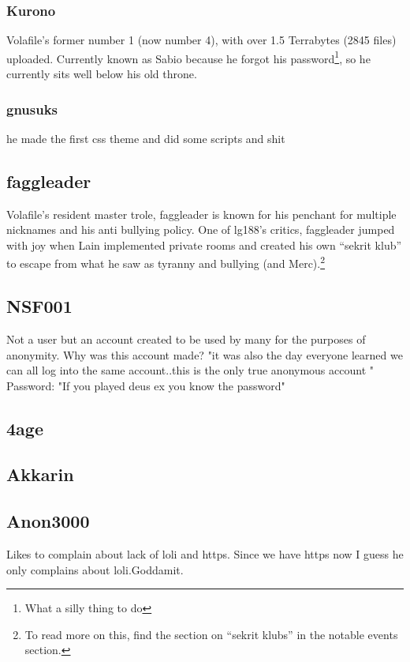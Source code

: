 \documentclass[12pt]{report}
\begin{document}
{\subsubsection{Kurono}
	Volafile's former number 1 (now number 4), with over 1.5 Terrabytes (2845 files) uploaded. Currently known as Sabio because he forgot his password\footnote{What a silly thing to do}, so he currently sits well below his old throne.
	
\subsubsection{gnusuks}
	he made the first css theme and did some scripts and shit 
	
\subsection{faggleader}
	Volafile's resident master trole, faggleader is known for his penchant for multiple nicknames and his anti bullying policy. One of lg188's critics, faggleader jumped with joy when Lain implemented private rooms and created his own ``sekrit klub'' to escape from what he saw as tyranny and bullying (and Merc).\footnote{To read more on this, find the section on ``sekrit klubs'' in the notable events section.}

\subsection{NSF001} %
	Not a user but an account created to be used by many for the purposes of anonymity.
	Why was this account made? "it was also the day everyone learned we can all log into the same account..this is the only true anonymous account " \\
	Password: "If you played deus ex you know the password"

\subsection{4age}

\subsection{Akkarin}

\subsection{Anon3000}
Likes to complain about lack of loli and https. Since we have https now I guess he only complains about loli.Goddamit.

}
\end{document}
